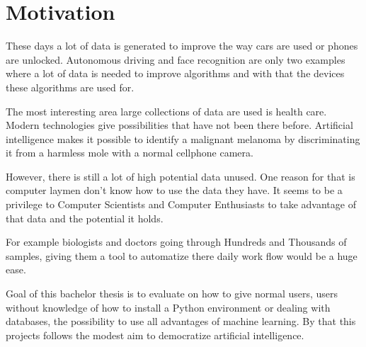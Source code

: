 \chapter{Motivation}

These days a lot of data is generated to improve the way cars are used or phones are unlocked. Autonomous driving and face recognition are only two examples where a lot of data is needed to improve algorithms and with that the devices these algorithms are used for. 

The most interesting area large collections of data are used is health care. Modern technologies give possibilities that have not been there before. Artificial intelligence makes it possible to identify a malignant melanoma by discriminating it from a harmless mole with a normal cellphone camera.

However, there is still a lot of high potential data unused. One reason for that is computer laymen don't know how to use the data they have. It seems to be a privilege to Computer Scientists and Computer Enthusiasts to take advantage of that data and the potential it holds. 

For example biologists and doctors going through Hundreds and Thousands of samples, giving them a tool to automatize there daily work flow would be a huge ease.

Goal of this bachelor thesis is to evaluate on how to give normal users, users without knowledge of how to install a Python environment or dealing with databases, the possibility to use all advantages of machine learning. By that this projects follows the modest aim to democratize artificial intelligence.